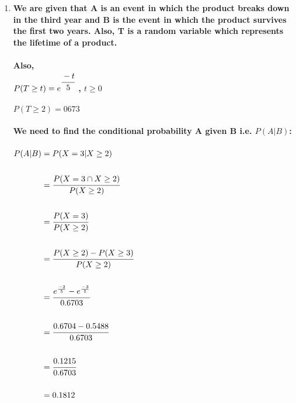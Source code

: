 \documentclass{article}
\begin{document}
\begin{enumerate}
\newpage

\item \large \textbf{We are given that A is an event in which the product breaks down in the third year and B is the event in which the product survives the first two years. Also, T is a random variable which represents the lifetime of a product.}\\\\

\textbf{Also,}\\
$P(T \geq t) = e ^ {\cfrac{-t}{5}} $ \textbf{, $t \geq 0$}\\\\
$P(T \geq 2) = 0673$\\\\

\textbf{We need to find the conditional probability A given B i.e. $P(A|B)$: }\\\\

$\begin{aligned}
    P(A|B) &= P(X=3 | X\geq2)\\\\
    &= \cfrac{P(X=3 \cap X\geq2)}{P(X \geq 2)}\\\\
    &= \cfrac{P(X=3)}{P(X \geq 2)}\\\\
    &= \cfrac{P(X \geq 2) - P(X \geq 3)}{P(X \geq 2)}\\\\
    &= \cfrac{e^\frac{-2}{5} - e^\frac{-3}{5}}{0.6703}\\\\
    &= \cfrac{0.6704 - 0.5488}{0.6703}\\\\
    &= \cfrac{0.1215}{0.6703}\\\\
    &= 0.1812
\end{aligned}$



\end{enumerate}
\end{document}
